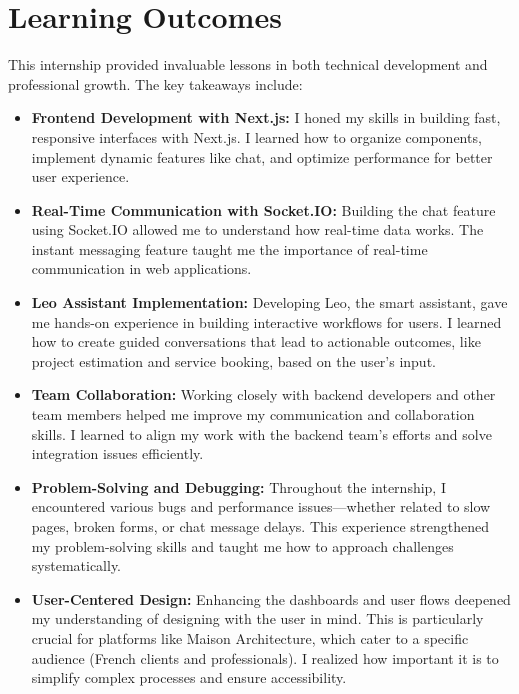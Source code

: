 \section{Learning Outcomes}
This internship provided invaluable lessons in both technical development and professional growth. The key takeaways include:

\begin{itemize}
    \item \textbf{Frontend Development with Next.js:} I honed my skills in building fast, responsive interfaces with Next.js. I learned how to organize components, implement dynamic features like chat, and optimize performance for better user experience.

    \item \textbf{Real-Time Communication with Socket.IO:} Building the chat feature using Socket.IO allowed me to understand how real-time data works. The instant messaging feature taught me the importance of real-time communication in web applications.

    \item \textbf{Leo Assistant Implementation:} Developing Leo, the smart assistant, gave me hands-on experience in building interactive workflows for users. I learned how to create guided conversations that lead to actionable outcomes, like project estimation and service booking, based on the user's input.

    \item \textbf{Team Collaboration:} Working closely with backend developers and other team members helped me improve my communication and collaboration skills. I learned to align my work with the backend team's efforts and solve integration issues efficiently.

    \item \textbf{Problem-Solving and Debugging:} Throughout the internship, I encountered various bugs and performance issues—whether related to slow pages, broken forms, or chat message delays. This experience strengthened my problem-solving skills and taught me how to approach challenges systematically.

    \item \textbf{User-Centered Design:} Enhancing the dashboards and user flows deepened my understanding of designing with the user in mind. This is particularly crucial for platforms like Maison Architecture, which cater to a specific audience (French clients and professionals). I realized how important it is to simplify complex processes and ensure accessibility.
\end{itemize}

